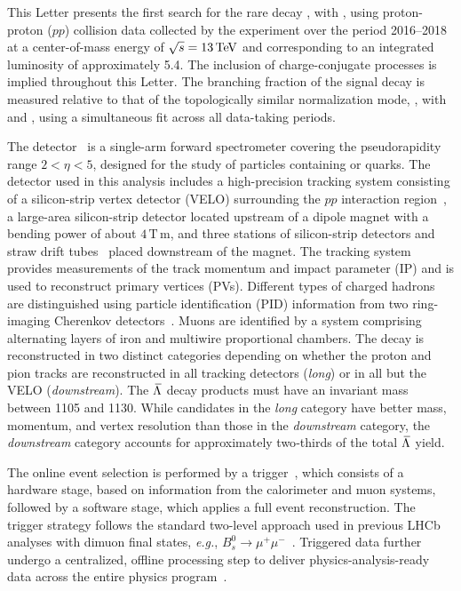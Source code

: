 This Letter presents the first search for the rare decay \btlpmm, with , using proton-proton ($pp$) collision data collected by the \lhcb experiment over the period 2016--2018 at a center-of-mass energy of $\sqrt{s}=13\text{\,Te\kern -0.1em V}$ and corresponding to an integrated luminosity of approximately 5.4\invfb.
The inclusion of charge-conjugate processes is implied throughout this Letter.
The branching fraction of the signal decay is measured relative to that of the topologically similar normalization mode, \btjpsilp, with \decay{\jpsi}{\mumu} and , using a simultaneous fit across all data-taking periods.



The \lhcb detector~\cite{LHCb-DP-2008-001,LHCb-DP-2014-002} is a single-arm forward spectrometer covering the pseudorapidity range $2<\eta<5$, designed for the study of particles containing \bquark or \cquark quarks. The detector used in this analysis includes a high-precision tracking system consisting of a silicon-strip vertex detector (VELO) surrounding the $pp$ interaction region~\cite{LHCb-DP-2014-001}, a large-area silicon-strip detector located upstream of a dipole magnet with a bending power of about $4{\mathrm{\,T\,m}}$, and three stations of silicon-strip detectors and straw drift tubes~\cite{LHCb-DP-2017-001} placed downstream of the magnet. The tracking system provides measurements of the track momentum and impact parameter (IP) and is used to reconstruct primary vertices (PVs).
Different types of charged hadrons are distinguished using particle identification (PID) information from two ring-imaging Cherenkov detectors~\cite{LHCb-DP-2012-003}.  Muons are identified by a system comprising alternating layers of iron and multiwire proportional chambers.
 The  decay is reconstructed in two distinct categories depending on whether the proton and pion tracks are reconstructed in all tracking detectors (\emph{long}) or in all but the VELO (\emph{downstream}). The ${\kern 0.18em\overline{\kern -0.18em \Lambda}}$ decay products must have an invariant mass between 1105 and 1130\mevcc.
 While candidates in the \emph{long} category have better mass, momentum, and vertex resolution than those in the \emph{downstream} category, the \emph{downstream} category accounts for approximately two‐thirds of the total ${\kern 0.18em\overline{\kern -0.18em \Lambda}}$ yield.


The online event selection is performed by a trigger~\cite{LHCb-DP-2012-004}, which consists of a hardware stage, based on information from the calorimeter and muon systems, followed by a software stage, which applies a full event reconstruction. The trigger strategy follows the standard two-level approach used in
previous LHCb analyses with dimuon final states, {\it e.g.}, $B_s^0 \to \mu^+ \mu^-$~\cite{LHCb-PAPER-2021-008}. Triggered data further undergo a centralized, offline processing step to deliver physics-analysis-ready data across the entire \lhcb physics program~\cite{Stripping}.



